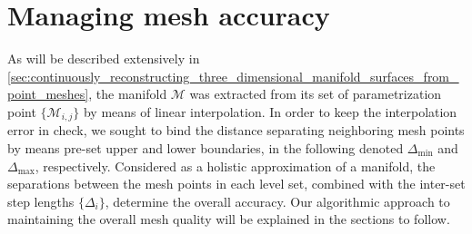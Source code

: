 \section{Managing mesh accuracy}
\label{sec:managing_mesh_accuracy}

As will be described extensively in
\cref{sec:continuously_reconstructing_three_dimensional_manifold_surfaces_from_point_meshes},
the manifold $\mathcal{M}$ was extracted from its set of parametrization
point $\{\mathcal{M}_{i,j}\}$ by means of linear interpolation. In order to
keep the interpolation error in check, we sought to bind the distance
separating neighboring mesh points by means pre-set upper and lower boundaries,
in the following denoted $\Delta_{\min}$ and $\Delta_{\max}$, respectively.
Considered as a holistic approximation of a manifold, the separations between
the mesh points in each level set, combined with the inter-set step lengths
$\{\Delta_{i}\}$, determine the overall accuracy. Our algorithmic approach
to maintaining the overall mesh quality will be explained in the
sections to follow.






